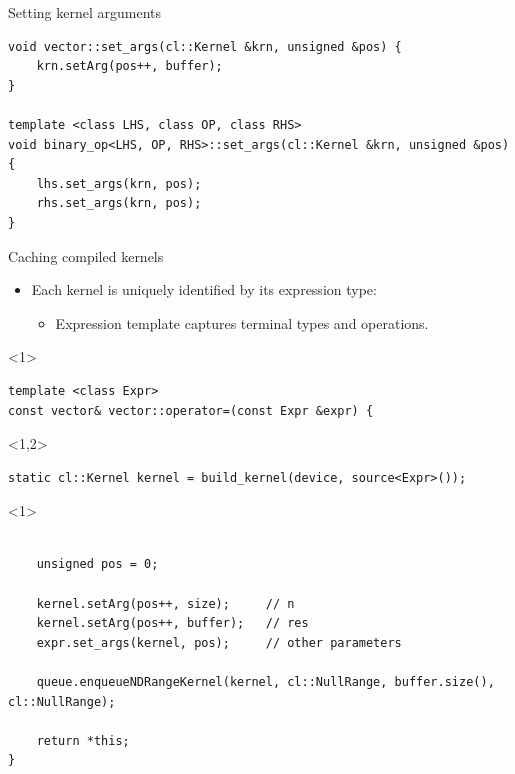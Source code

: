 \documentclass[@BEAMER_OPTIONS@]{beamer}
\begin{document}
\note{ }

\begin{frame}[fragile]{Setting kernel arguments}
    \begin{exampleblock}{}
        \begin{lstlisting}
void vector::set_args(cl::Kernel &krn, unsigned &pos) {
    krn.setArg(pos++, buffer);
}

template <class LHS, class OP, class RHS>
void binary_op<LHS, OP, RHS>::set_args(cl::Kernel &krn, unsigned &pos) {
    lhs.set_args(krn, pos);
    rhs.set_args(krn, pos);
}
        \end{lstlisting}
    \end{exampleblock}
\end{frame}

\note{ }

\begin{frame}[fragile]{Caching compiled kernels}
    \begin{itemize}
        \item Each kernel is uniquely identified by its expression type:
            \begin{itemize}
                \item Expression template captures terminal types and
                    operations.
            \end{itemize}
    \end{itemize}
    \begin{exampleblock}{}
        \begin{uncoverenv}<1>
            \begin{lstlisting}
template <class Expr>
const vector& vector::operator=(const Expr &expr) {
            \end{lstlisting}
        \end{uncoverenv}
        \begin{uncoverenv}<1,2>
            \begin{lstlisting}[firstnumber=last]
    static cl::Kernel kernel = build_kernel(device, source<Expr>());
            \end{lstlisting}
        \end{uncoverenv}
        \begin{uncoverenv}<1>
            \begin{lstlisting}[firstnumber=last]

    unsigned pos = 0;

    kernel.setArg(pos++, size);     // n
    kernel.setArg(pos++, buffer);   // res
    expr.set_args(kernel, pos);     // other parameters

    queue.enqueueNDRangeKernel(kernel, cl::NullRange, buffer.size(), cl::NullRange);

    return *this;
}
            \end{lstlisting}
        \end{uncoverenv}
    \end{exampleblock}
\end{frame}
\end{document}
